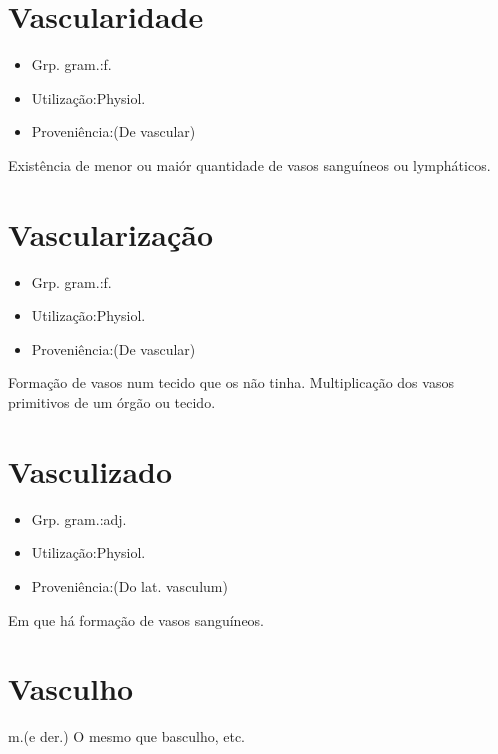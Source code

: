 \documentclass{article}
\begin{document}
\section{Vascularidade}
\begin{itemize}
\item {Grp. gram.:f.}
\end{itemize}
\begin{itemize}
\item {Utilização:Physiol.}
\end{itemize}
\begin{itemize}
\item {Proveniência:(De \textunderscore vascular\textunderscore )}
\end{itemize}
Existência de menor ou maiór quantidade de vasos sanguíneos ou lympháticos.
\section{Vascularização}
\begin{itemize}
\item {Grp. gram.:f.}
\end{itemize}
\begin{itemize}
\item {Utilização:Physiol.}
\end{itemize}
\begin{itemize}
\item {Proveniência:(De \textunderscore vascular\textunderscore )}
\end{itemize}
Formação de vasos num tecido que os não tinha.
Multiplicação dos vasos primitivos de um órgão ou tecido.
\section{Vasculizado}
\begin{itemize}
\item {Grp. gram.:adj.}
\end{itemize}
\begin{itemize}
\item {Utilização:Physiol.}
\end{itemize}
\begin{itemize}
\item {Proveniência:(Do lat. \textunderscore vasculum\textunderscore )}
\end{itemize}
Em que há formação de vasos sanguíneos.
\section{Vasculho}
\textunderscore m.\textunderscore  (e der.)
O mesmo que \textunderscore basculho\textunderscore , etc.
\end{document}
